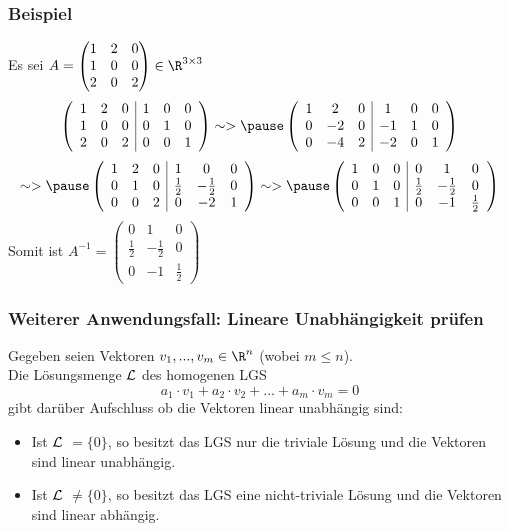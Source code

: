 \begin{frame}\frametitle{Beispiel}
Es sei $A=\begin{pmatrix}1 & 2 & 0 \\ 1 & 0&0 \\ 2 & 0 & 2  \end{pmatrix} \in \R^{3\times 3}$	\\
\vfill\pause
	$$
		\left(
		\begin{array}{ccc|ccc}
			1&2&0 	&1&0&0\\
			1&0&0	&0&1&0\\
			2&0&2	&0&0&1
		\end{array}
		\right) \sim> \pause
				\left(
		\begin{array}{ccc|ccc}
			1&2&0 	&1&0&0\\
			0&-2&0	&-1&1&0\\
			0&-4&2	&-2&0&1
		\end{array}
		\right)
	$$	
		$$
		\sim> \pause\left(
		\begin{array}{ccc|ccc}
			1&2&0 	&1&0&0\\
			0&1&0	&\frac{1}{2}&-\frac{1}{2}&0\\
			0&0&2	&0&-2&1
		\end{array}
		\right) 	\sim>\pause
		\left(
		\begin{array}{ccc|ccc}
			1&0&0 	&0&1&0\\
			0&1&0	&\frac{1}{2}&-\frac{1}{2}&0\\
			0&0&1	&0&-1&\frac{1}{2}
		\end{array}
		\right) 
	$$\pause \vfill
	Somit ist $A^{-1}=\begin{pmatrix}0&1&0 \\ \frac{1}{2}&-\frac{1}{2}&0 \\0&-1&\frac{1}{2}  \end{pmatrix}$
\end{frame}
%
\begin{frame}\frametitle{Weiterer Anwendungsfall: Lineare Unabhängigkeit prüfen}
Gegeben seien Vektoren $v_1,...,v_m \in \R^n$ (wobei $m \le n$). \\\vfill
Die Lösungsmenge $\cal L$ des homogenen LGS
$$
a_1\cdot v_1 + a_2\cdot v_2 + ... +a_m\cdot v_m=0
$$
gibt darüber Aufschluss ob die Vektoren linear unabhängig sind:\\
\begin{itemize}
\item Ist $\cal L$ $=\{0\}$, so besitzt das LGS nur die triviale Lösung und die Vektoren sind linear unabhängig.
\item Ist $\cal L$ $\ne\{0\}$, so besitzt das LGS eine nicht-triviale Lösung und die Vektoren sind linear abhängig.
\end{itemize}
\end{frame}
